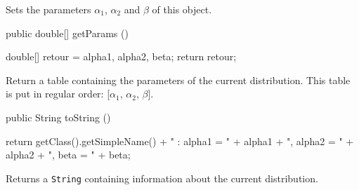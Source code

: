 \begin{tabb}
   Sets the parameters $\alpha_1$, $\alpha_2$ and $\beta$ of this object.
\end{tabb}
\begin{code}

   public double[] getParams ()\begin{hide} {
      double[] retour = {alpha1, alpha2, beta};
      return retour;
   }\end{hide}
\end{code}
\begin{tabb}
   Return a table containing the parameters of the current distribution.
   This table is put in regular order: [$\alpha_1$, $\alpha_2$, $\beta$].
\end{tabb}
\begin{hide}\begin{code}

   public String toString ()\begin{hide} {
      return getClass().getSimpleName() + " : alpha1 = " + alpha1 + ", alpha2 = " + alpha2 + ", beta = " + beta;
   }\end{hide}
\end{code}
\begin{tabb}
   Returns a \texttt{String} containing information about the current distribution.
\end{tabb}\end{hide}
\begin{code}\begin{hide}
}\end{hide}
\end{code}
